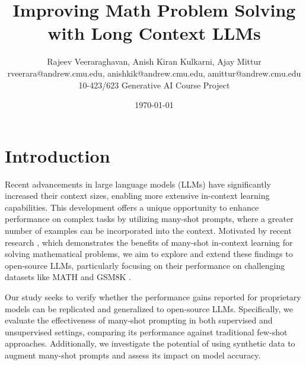 \documentclass[twocolumn,11pt]{article}
\begin{document}
\title{Improving Math Problem Solving with Long Context LLMs}
\author{Rajeev Veeraraghavan, Anish Kiran Kulkarni, Ajay Mittur \\
rveerara@andrew.cmu.edu, anishkik@andrew.cmu.edu, amittur@andrew.cmu.edu\\
10-423/623 Generative AI Course Project}
\date{\today}
\maketitle




\section{Introduction}

Recent advancements in large language models (LLMs) have significantly increased their context sizes, enabling more extensive in-context learning capabilities. This development offers a unique opportunity to enhance performance on complex tasks by utilizing many-shot prompts, where a greater number of examples can be incorporated into the context. Motivated by recent research \cite{agarwal2024manyshotincontextlearning}, which demonstrates the benefits of many-shot in-context learning for solving mathematical problems, we aim to explore and extend these findings to open-source LLMs, particularly focusing on their performance on challenging datasets like MATH \cite{hendrycksmath2021} and GSM8K \cite{cobbe2021gsm8k}.

Our study seeks to verify whether the performance gains reported for proprietary models can be replicated and generalized to open-source LLMs. Specifically, we evaluate the effectiveness of many-shot prompting in both supervised and unsupervised settings, comparing its performance against traditional few-shot approaches. Additionally, we investigate the potential of using synthetic data to augment many-shot prompts and assess its impact on model accuracy.
\end{document}
